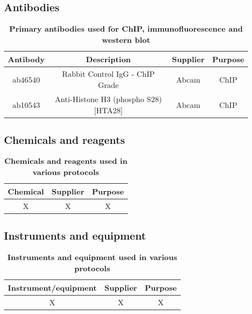 \documentclass[11pt,twoside,a4paper]{report}
\begin{document}
		\subsection{Antibodies}
			\begin{table}[!ht]
       		\caption{
            		\bf{Primary antibodies used for ChIP, immunofluorescence and western blot}
        }
        		\begin{center}
            		\begin{tabular}{|c|c|c|c|}
                		\hline
	                Antibody & Description & Supplier & Purpose\\
    		            \hline
        		        ab46540 & Rabbit Control IgG - ChIP Grade & Abcam & ChIP\\
            		    ab10543 & Anti-Histone H3 (phospho S28) [HTA28] & Abcam & ChIP\\
	                \hline
	            \end{tabular}
    		    \end{center}
		    \end{table}
		  
		\subsection{Chemicals and reagents}
			\begin{table}[!ht]
       		\caption{
            		\bf{Chemicals and reagents used in various protocols}
        }
        		\begin{center}
            		\begin{tabular}{|c|c|c|}
                		\hline
	                Chemical & Supplier & Purpose\\
    		            \hline
        		        X & X & X\\
	                \hline
	            \end{tabular}
    		    \end{center}
		    \end{table}
    
    		\subsection{Instruments and equipment}
			\begin{table}[!ht]
       		\caption{
            		\bf{Instruments and equipment used in various protocols}
        }
        		\begin{center}
            		\begin{tabular}{|c|c|c|}
                		\hline
	                Instrument/equipment & Supplier & Purpose\\
    		            \hline
					X & X & X\\
	                \hline
	            \end{tabular}
    		    \end{center}
		    \end{table}
		    
\end{document}
